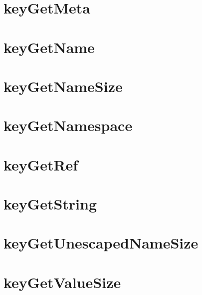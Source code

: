 \let\mypdfximage\pdfximage\def\pdfximage{\immediate\mypdfximage}\documentclass[twoside]{book}
\newcommand{\+}{\discretionary{\mbox{\scriptsize$\hookleftarrow$}}{}{}}
\begin{document}
\chapter{key\+Get\+Meta}
\label{doc_api_review_core_keyGetMeta_md}

\chapter{key\+Get\+Name}
\label{doc_api_review_core_keyGetName_md}

\chapter{key\+Get\+Name\+Size}
\label{doc_api_review_core_keyGetNameSize_md}

\chapter{key\+Get\+Namespace}
\label{doc_api_review_core_keyGetNamespace_md}

\chapter{key\+Get\+Ref}
\label{doc_api_review_core_keyGetRef_md}

\chapter{key\+Get\+String}
\label{doc_api_review_core_keyGetString_md}

\chapter{key\+Get\+Unescaped\+Name\+Size}
\label{doc_api_review_core_keyGetUnescapedNameSize_md}

\chapter{key\+Get\+Value\+Size}
\label{doc_api_review_core_keyGetValueSize_md}

\end{document}

